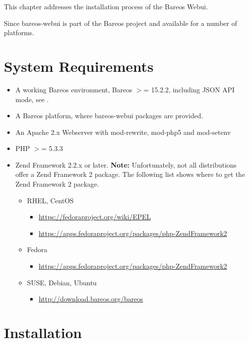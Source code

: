 
This chapter addresses the installation process of the Bareos Webui.

Since  bareos-webui is part of the Bareos project and available for a number of platforms.


\section{System Requirements}

\begin{itemize}
\item A working Bareos environment, Bareos $>$= 15.2.2, including JSON API mode, see .
\item A Bareos platform, where bareos-webui packages are provided.
\item An Apache 2.x Webserver with mod-rewrite, mod-php5 and mod-setenv
\item PHP $>$= 5.3.3
\item Zend Framework 2.2.x or later.
  \textbf{Note:} Unfortunately, not all distributions offer a Zend Framework 2 package.
  The following list shows where to get the Zend Framework 2 package.
  \begin{itemize}
  \item RHEL, CentOS
    \begin{itemize}
    \item \url{https://fedoraproject.org/wiki/EPEL}
    \item \url{https://apps.fedoraproject.org/packages/php-ZendFramework2}
    \end{itemize}

  \item Fedora
    \begin{itemize}
    \item \url{https://apps.fedoraproject.org/packages/php-ZendFramework2}
    \end{itemize}

  \item SUSE, Debian, Ubuntu
    \begin{itemize}
    \item \url{http://download.bareos.org/bareos}
    \end{itemize}
  \end{itemize}
\end{itemize}

\section{Installation}

